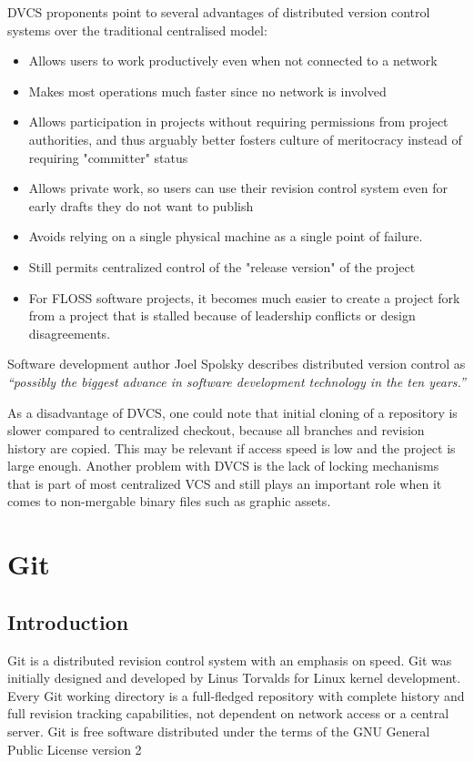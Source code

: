 DVCS proponents point to several advantages of distributed version control
systems over the traditional centralised model:
\begin{itemize}[itemsep=1pt, parsep=1pt]
  \item Allows users to work productively even when not connected to a network
  \item Makes most operations much faster since no network is involved
  \item Allows participation in projects without requiring permissions from
  project authorities, and thus arguably better fosters culture of
  meritocracy instead of requiring "committer" status
  \item Allows private work, so users can use their revision control system even
  for early drafts they do not want to publish
  \item Avoids relying on a single physical machine as a single point of
  failure.
  \item Still permits centralized control of the "release version" of the
  project
  \item For FLOSS software projects, it becomes much easier to create a project
  fork from a project that is stalled because of leadership conflicts or design
  disagreements.
\end{itemize}

Software development author Joel Spolsky describes distributed version control
as \emph{``possibly the biggest advance in software development technology in
the ten years.''}

As a disadvantage of DVCS, one could note that initial cloning of a repository is
slower compared to centralized checkout, because all branches and revision
history are copied. This may be relevant if access speed is low and the project
is large enough. Another problem with DVCS is the lack of locking mechanisms that
is part of most centralized VCS and still plays an important role when it comes
to non-mergable binary files such as graphic assets.

\section{Git}
\subsection{Introduction}
Git is a distributed revision control system with an emphasis on speed. Git was
initially designed and developed by Linus Torvalds for Linux kernel development.
Every Git working directory is a full-fledged repository with complete history
and full revision tracking capabilities, not dependent on network access or a
central server. Git is free software distributed under the terms of the GNU
General Public License version 2
